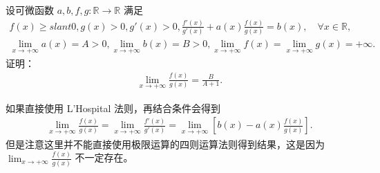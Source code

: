 \documentclass[../../main.tex]{subfiles}
\begin{document}
\begin{example}
设可微函数 \(a, b, f, g : \mathbb{R} \to \mathbb{R}\) 满足
\begin{align*}
f(x) \geqslant slant 0, g(x) > 0, g'(x) > 0, \frac{f'(x)}{g'(x)} + a(x) \frac{f(x)}{g(x)} = b(x), \quad \forall x \in \mathbb{R}, \\
\lim_{x \to +\infty} a(x) = A > 0, \lim_{x \to +\infty} b(x) = B > 0, \lim_{x \to +\infty} f(x) = \lim_{x \to +\infty} g(x) = +\infty.
\end{align*}
证明：
\begin{align*}
\lim_{x \to +\infty} \frac{f(x)}{g(x)} = \frac{B}{A + 1}.
\end{align*} 
\end{example}
\begin{remark}
如果直接使用 L'Hospital 法则，再结合条件会得到
\begin{align*}
\lim_{x \to +\infty} \frac{f(x)}{g(x)} = \lim_{x \to +\infty} \frac{f'(x)}{g'(x)} = \lim_{x \to +\infty} \left[ b(x) - a(x) \frac{f(x)}{g(x)} \right].
\end{align*}
但是注意这里并不能直接使用极限运算的四则运算法则得到结果，这是因为 \(\lim_{x \to +\infty} \frac{f(x)}{g(x)}\) 不一定存在。 
\end{remark}
\end{document}
